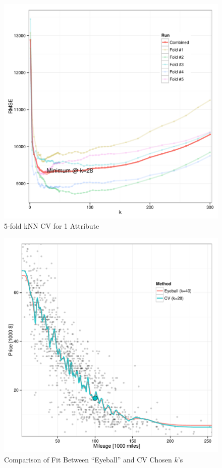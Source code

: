 \documentclass[11pt, fleqn]{article}
\begin{document}
\begin{figure}[!htb]
  \centering
  \includegraphics[scale=.5]{1p_cv_k.pdf}
  \caption{5-fold kNN CV for 1 Attribute}
  \label{fig:1p_k}
\end{figure}

\begin{figure}[!htb]
  \centering
  \includegraphics[scale=.5]{1p_fit_eye_ev.pdf}
  \caption{Comparison of Fit Between ``Eyeball'' and CV Chosen $k$'s}
  \label{fig:1p_fit}
\end{figure}
\end{document}
